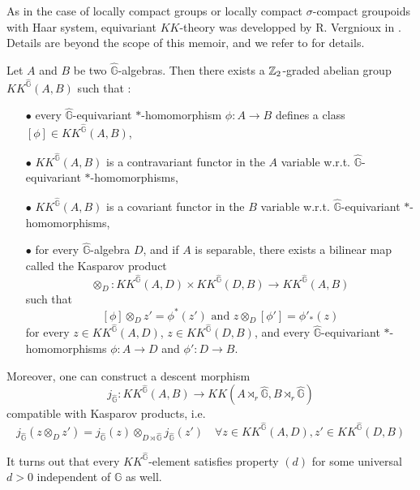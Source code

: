 As in the case of locally compact groups or locally compact $\sigma$-compact groupoids with Haar system, equivariant $KK$-theory was developped by R. Vergnioux in \cite{vergnioux}. Details are beyond the scope of this memoir, and we refer to \cite{vergnioux} for details.\\

\begin{prop}
Let $A$ and $B$ be two $\hat{\mathbb G}$-algebras. Then there exists a $\mathbb Z_2$-graded abelian group $KK^{\hat{\mathbb G}}(A,B) $ such that :
\begin{itemize}
\item[$\bullet$] every $\hat{\mathbb G}$-equivariant $*$-homomorphism $\phi : A\rightarrow B$ defines a class $[\phi]\in KK^{\hat{\mathbb G}}(A,B)$,
\item[$\bullet$] $KK^{\hat{\mathbb G}}(A,B)$ is a contravariant functor in the $A$ variable w.r.t. $\hat{\mathbb G}$-equivariant $*$-homomorphisms,
\item[$\bullet$] $KK^{\hat{\mathbb G}}(A,B)$ is a covariant functor in the $B$ variable w.r.t. $\hat{\mathbb G}$-equivariant $*$-homomorphisms,
\item[$\bullet$] for every $\hat{\mathbb G}$-algebra $D$, and if $A$ is separable, there exists a bilinear map called the Kasparov product 
\[\otimes_D : KK^{\hat{\mathbb G}}(A,D)\times KK^{\hat{\mathbb G}}(D,B)  \rightarrow  KK^{\hat{\mathbb G}}(A,B)\]
such that 
\[ [\phi]\otimes_D z' = \phi^*(z') \text{ and } z\otimes_D[\phi'] = \phi'_*(z)\]
for every $z\in KK^{\hat{\mathbb G}}(A,D)$, $z\in KK^{\hat{\mathbb G}}(D,B)$, and every $\hat{\mathbb G}$-equivariant $*$-homomorphisms $\phi : A \rightarrow D$ and $\phi' : D\rightarrow B$.
\end{itemize}
Moreover, one can construct a descent morphism
\[j_{\hat{\mathbb G}} : KK^{\hat{\mathbb G}}(A,B)\rightarrow KK(A\rtimes_r \hat{\mathbb G},B\rtimes_r \hat{\mathbb G})\]
compatible with Kasparov products, i.e. 
\[j_{\hat{\mathbb G}}(z\otimes_D z') = j_{\hat{\mathbb G}}(z)\otimes_{D\rtimes \hat{\mathbb G}} j_{\hat{\mathbb G}}(z')\quad \forall z\in KK^{\hat{\mathbb G}}(A,D),z'\in KK^{\hat{\mathbb G}}(D,B) \]
\end{prop}

It turns out that every $KK^{\hat{\mathbb G}}$-element satisfies property $(d)$ for some universal $d>0$ independent of $\mathbb G$ as well.































